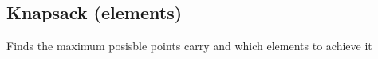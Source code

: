 \subsection{Knapsack (elements)}

Finds the maximum posisble points carry and which elements to achieve it
